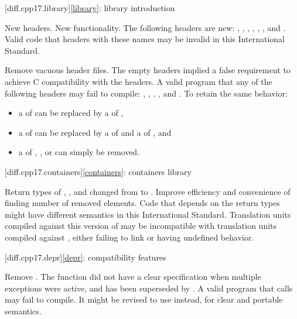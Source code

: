 [diff.cpp17.library]{\ref{library}: library introduction}

\change New headers.
\rationale New functionality.
\effect
The following \Cpp{} headers are new:
,
,
,
,
,
, and
.
Valid \CppXVII{} code that  headers with these names may be
invalid in this International Standard.

\change Remove vacuous \Cpp{} header files.
\rationale
The empty headers implied a false requirement to achieve C compatibility with the \Cpp{} headers.
\effect
A valid \CppXVII{} program that  any of the following headers may fail to compile:
,
,
,
, and
.
To retain the same behavior:
\begin{itemize}
\item
a  of  can be replaced by
a  of ,
\item
a  of  can be replaced by
a  of  and
a  of ,
and
\item
a  of
,
, or
can simply be removed.
\end{itemize}

[diff.cpp17.containers]{\ref{containers}: containers library}

\change
Return types of , , and 
changed from  to .
\rationale Improve efficiency and convenience of finding number of removed elements.
\effect
Code that depends on the return types might have different semantics in this International Standard.
Translation units compiled against this version of \Cpp{} may be incompatible with
translation units compiled against \CppXVII{}, either failing to link or having undefined behavior.

[diff.cpp17.depr]{\ref{depr}: compatibility features}

\nodiffref
\change Remove .
\rationale
The function did not have a clear specification when multiple exceptions were
active, and has been superseded by .
\effect
A valid \CppXVII{} program that calls  may fail
to compile. It might be revised to use  instead,
for clear and portable semantics.

